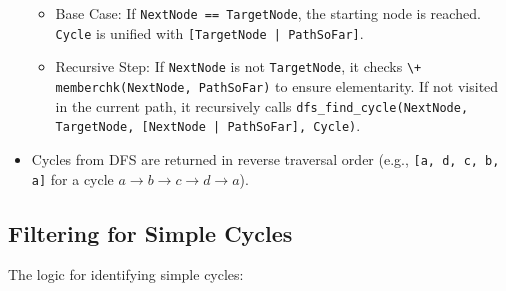 \documentclass[12pt,a4paper]{article}
\begin{document}
\begin{itemize}
\begin{itemize}
\item Base Case: If \texttt{NextNode == TargetNode}, the starting node is reached. \texttt{Cycle} is unified with \texttt{[TargetNode | PathSoFar]}.
\item Recursive Step: If \texttt{NextNode} is not \texttt{TargetNode}, it checks \texttt{\textbackslash+ memberchk(NextNode, PathSoFar)} to ensure elementarity. If not visited in the current path, it recursively calls \texttt{dfs\_find\_cycle(NextNode, TargetNode, [NextNode | PathSoFar], Cycle)}.
\end{itemize}
\item Cycles from DFS are returned in reverse traversal order (e.g., \texttt{[a, d, c, b, a]} for a cycle $a \rightarrow b \rightarrow c \rightarrow d \rightarrow a$). 
\end{itemize}
\subsection{Filtering for Simple Cycles}
The logic for identifying simple cycles:
\end{document}
